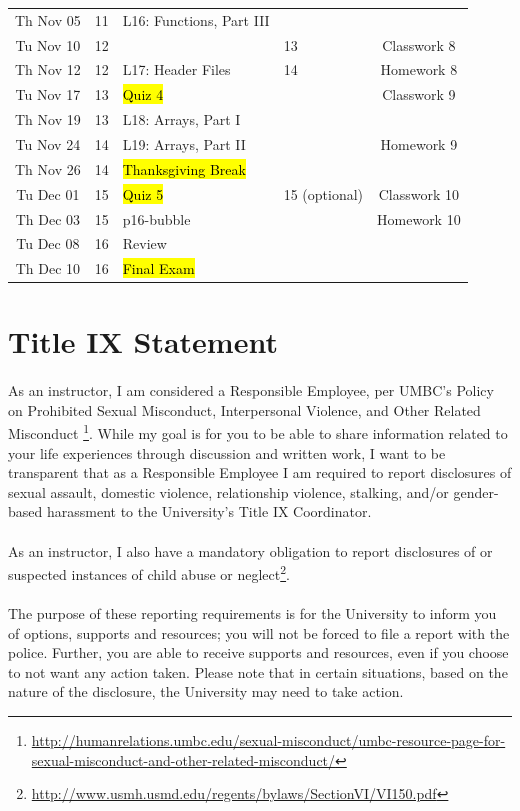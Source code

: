 \documentclass[letter,11pt]{article}
\begin{document}
\begin{tabular}{c c l l c}
Th Nov 05 & 11 & L16: Functions, Part III & &  \\
Tu Nov 10 & 12 &  & 13 & Classwork 8 \\
Th Nov 12 & 12 & L17: Header Files & 14 & Homework 8 \\
Tu Nov 17 & 13 & \hl{Quiz 4} & & Classwork 9 \\
Th Nov 19 & 13 & L18: Arrays, Part I & \\
Tu Nov 24 & 14 & L19: Arrays, Part II &  & Homework 9\\
Th Nov 26 & 14 & \hl{Thanksgiving Break} &  \\ \hline
Tu Dec 01 & 15 & \hl{Quiz 5} & 15 (optional) & Classwork 10 \\
Th Dec 03 & 15 & p16-bubble & & Homework 10 \\
Tu Dec 08 & 16 & Review &  \\
Th Dec 10 & 16 & \hl{Final Exam} & \\
\end{tabular}

\section*{Title IX Statement}
\paragraph{}As an instructor, I am considered a Responsible Employee, per UMBC’s Policy on Prohibited Sexual Misconduct, Interpersonal Violence, and Other Related Misconduct \footnote{\url{http://humanrelations.umbc.edu/sexual-misconduct/umbc-resource-page-for-sexual-misconduct-and-other-related-misconduct/}}. While my goal is for you to be able to share information related to your life experiences through discussion and written work, I want to be transparent that as a Responsible Employee I am required to report disclosures of sexual assault, domestic violence, relationship violence, stalking, and/or gender-based harassment to the University’s Title IX Coordinator.

\paragraph{}As an instructor, I also have a mandatory obligation to report disclosures of or suspected instances of child abuse or neglect\footnote{\url{http://www.usmh.usmd.edu/regents/bylaws/SectionVI/VI150.pdf}}.

\paragraph{}The purpose of these reporting requirements is for the University to inform you of options, supports and resources; you will not be forced to file a report with the police. Further, you are able to receive supports and resources, even if you choose to not want any action taken. Please note that in certain situations, based on the nature of the disclosure, the University may need to take action.
\end{document}

